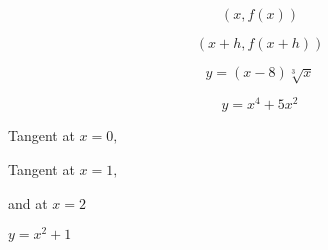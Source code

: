 \documentclass{article}
\begin{document}
$$
(x, f(x))
$$

$$
(x+h, f(x+h))
$$

$$
y=(x-8)\sqrt[3]{x}
$$ 

$$
y=x^4+5x^2
$$

Tangent at $x=0,$

Tangent at $x=1,$

and at $x=2$
 

$y=x^2+1$
\end{document}
